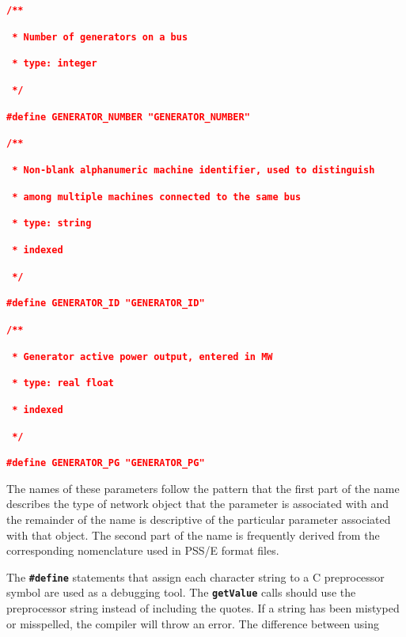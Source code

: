 \documentclass[12pt]{report} %
\begin{document}
\textcolor{red}{\texttt{\textbf{/**}}}

\textcolor{red}{\texttt{\textbf{ * Number of generators on a bus}}}

\textcolor{red}{\texttt{\textbf{ * type: integer}}}

\textcolor{red}{\texttt{\textbf{ */}}}

\textcolor{red}{\texttt{\textbf{\#define GENERATOR\_NUMBER "GENERATOR\_NUMBER"}}}

\textcolor{red}{\texttt{\textbf{}}}

\textcolor{red}{\texttt{\textbf{/**}}}

\textcolor{red}{\texttt{\textbf{ * Non-blank alphanumeric machine identifier, used to distinguish}}}

\textcolor{red}{\texttt{\textbf{ * among multiple machines connected to the same bus  }}}

\textcolor{red}{\texttt{\textbf{ * type: string}}}

\textcolor{red}{\texttt{\textbf{ * indexed}}}

\textcolor{red}{\texttt{\textbf{ */}}}

\textcolor{red}{\texttt{\textbf{\#define GENERATOR\_ID "GENERATOR\_ID"}}}

\textcolor{red}{\texttt{\textbf{}}}

\textcolor{red}{\texttt{\textbf{/**}}}

\textcolor{red}{\texttt{\textbf{ * Generator active power output, entered in MW }}}

\textcolor{red}{\texttt{\textbf{ * type: real float}}}

\textcolor{red}{\texttt{\textbf{ * indexed}}}

\textcolor{red}{\texttt{\textbf{ */}}}

\textcolor{red}{\texttt{\textbf{\#define GENERATOR\_PG "GENERATOR\_PG"}}}

The names of these parameters follow the pattern that the first part of the name describes the type of network object that the parameter is associated with and the remainder of the name is descriptive of the particular parameter associated with that object. The second part of the name is frequently derived from the corresponding nomenclature used in PSS/E format files.

The \texttt{\textbf{\#define}} statements that assign each character string to a C preprocessor symbol are used as a debugging tool. The \texttt{\textbf{getValue}} calls should use the preprocessor string instead of including the quotes. If a string has been mistyped or misspelled, the compiler will throw an error. The difference between using
\end{document}
